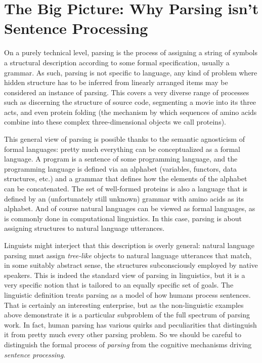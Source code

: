 \chapter{The Big Picture: Why Parsing isn't Sentence Processing}
\label{cha:BigPicture}

On a purely technical level, parsing is the process of assigning a string of symbols a structural description according to some formal specification, usually a grammar.
As such, parsing is not specific to language, any kind of problem where hidden structure has to be inferred from linearly arranged items may be considered an instance of parsing.
This covers a very diverse range of processes such as discerning the structure of source code, segmenting a movie into its three acts, and even protein folding (the mechanism by which sequences of amino acids combine into these complex three-dimensional objects we call proteins).

This general view of parsing is possible thanks to the semantic agnosticism of formal languages: pretty much everything can be conceptualized as a formal language.
A program is a sentence of some programming language, and the programming language is defined via an alphabet (variables, functors, data structures, etc.) and a grammar that defines how the elements of the alphabet can be concatenated.
The set of well-formed proteins is also a language that is defined by an (unfortunately still unknown) grammar with amino acids as its alphabet.
And of course natural languages can be viewed as formal languages, as is commonly done in computational linguistics.
In this case, parsing is about assigning structures to natural language utterances. 

Linguists might interject that this description is overly general: natural language parsing must assign \emph{tree-like} objects to natural language utterances that match, in some suitably abstract sense, the structures subconsciously employed by native speakers.
This is indeed the standard view of parsing in linguistics, but it is a very specific notion that is tailored to an equally specific set of goals.
The linguistic definition treats parsing as a model of how humans process sentences.
That is certainly an interesting enterprise, but as the non-linguistic examples above demonstrate it is a particular subproblem of the full spectrum of parsing work.
In fact, human parsing has various quirks and peculiarities that distinguish it from pretty much every other parsing problem.
So we should be careful to distinguish the formal process of \emph{parsing} from the cognitive mechanisms driving \emph{sentence processing}.

